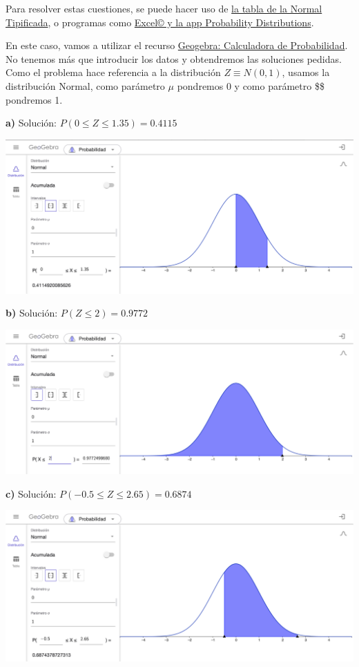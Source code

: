 \documentclass[
]{book}
\begin{document}
Para resolver estas cuestiones, se puede hacer uso de \href{https://youtu.be/xCBUdpIUx18}{la tabla de la Normal Tipificada}, o programas como \href{https://youtu.be/bTnVHL9yG8o?si=I3fjGEwCmzLlbQrI}{Excel© y la app Probability Distributions}.

En este caso, vamos a utilizar el recurso \href{https://www.geogebra.org/calculator}{Geogebra: Calculadora de Probabilidad}. No tenemos más que introducir los datos y obtendremos las soluciones pedidas. Como el problema hace referencia a la distribución \(Z \equiv N(0,1)\), usamos la distribución Normal, como parámetro \(\mu\) pondremos 0 y como parámetro \$\sigma \$ pondremos 1.

\textbf{a)} Solución: \(P(0 \leq Z \leq 1.35) = 0.4115\)

\includegraphics[width=28.44in]{img/3_4}

\textbf{b)} Solución: \(P(Z \leq 2) = 0.9772\)

\includegraphics[width=28.44in]{img/3_5}

\textbf{c)} Solución: \(P(-0.5 \leq Z \leq 2.65) = 0.6874\)

\includegraphics[width=28.44in]{img/3_6}
\end{document}

